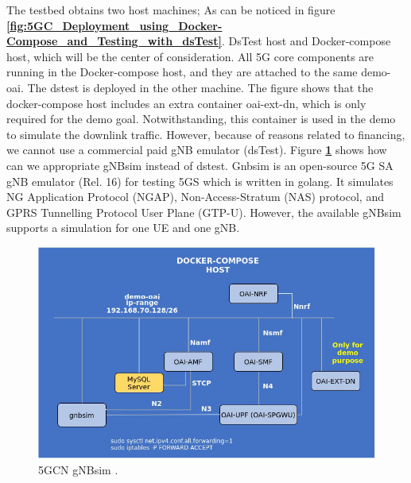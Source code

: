 The testbed obtains two host machines; As can be noticed in figure
\textbf{\ref{fig:5GC_Deployment_using_Docker-Compose_and_Testing_with_dsTest}}. DsTest host and Docker-compose host, which will be the center of consideration. All 5G core components are running in the Docker-compose host, and they are attached to the same demo-oai. The dstest is deployed in the other machine. The figure shows that the docker-compose host includes an extra container oai-ext-dn, which is only required for the demo goal. Notwithstanding, this container is used in the demo to simulate the downlink traffic. However, because of reasons related to financing, we cannot use a commercial paid gNB emulator (dsTest). Figure \textbf{\ref{fig:5gCN_gnbsim}} shows how can we appropriate gNBsim instead of dstest. Gnbsim is an open-source 5G SA gNB emulator (Rel. 16) for testing 5GS which is written in golang. It simulates NG Application Protocol (NGAP), Non-Access-Stratum (NAS) protocol, and GPRS Tunnelling Protocol User Plane (GTP-U). However, the available gNBsim supports a simulation for one UE and one gNB.




\begin{figure}
\centering
\includegraphics[scale=0.40]{images/5gCN_gnbsim.png}
\caption{5GCN gNBsim  \cite{openairinterface2014}.}
\label{fig:5gCN_gnbsim}
\end{figure}

\clearpage


